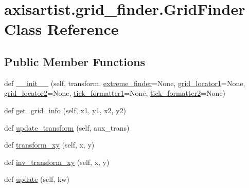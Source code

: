 \hypertarget{classaxisartist_1_1grid__finder_1_1GridFinder}{}\section{axisartist.\+grid\+\_\+finder.\+Grid\+Finder Class Reference}
\label{classaxisartist_1_1grid__finder_1_1GridFinder}
\subsection*{Public Member Functions}
\begin{DoxyCompactItemize}
\item 
def \hyperlink{classaxisartist_1_1grid__finder_1_1GridFinder_adeaa7117f68b85874c1da9c6ec4aa956}{\+\_\+\+\_\+init\+\_\+\+\_\+} (self, transform, \hyperlink{classaxisartist_1_1grid__finder_1_1GridFinder_a7dca575c2c13d46cd4fc27f5a1e5cb07}{extreme\+\_\+finder}=None, \hyperlink{classaxisartist_1_1grid__finder_1_1GridFinder_abeb0fe9750ba28d2b847e34f9da636d8}{grid\+\_\+locator1}=None, \hyperlink{classaxisartist_1_1grid__finder_1_1GridFinder_adfdea1141739ba75d0f67dc30fbc37ab}{grid\+\_\+locator2}=None, \hyperlink{classaxisartist_1_1grid__finder_1_1GridFinder_a5bfedc420fc21184b5df572bb7f5f1cc}{tick\+\_\+formatter1}=None, \hyperlink{classaxisartist_1_1grid__finder_1_1GridFinder_a23a619043edcf38696552f03e4cb5ae6}{tick\+\_\+formatter2}=None)
\item 
def \hyperlink{classaxisartist_1_1grid__finder_1_1GridFinder_a340ff860d9f9a9d0e90ffa5b76ed5bac}{get\+\_\+grid\+\_\+info} (self, x1, y1, x2, y2)
\item 
def \hyperlink{classaxisartist_1_1grid__finder_1_1GridFinder_a0597fe3ef31a55ca0effb7a7d1ed776d}{update\+\_\+transform} (self, aux\+\_\+trans)
\item 
def \hyperlink{classaxisartist_1_1grid__finder_1_1GridFinder_a6f3bf889d5608045f6130247a909270c}{transform\+\_\+xy} (self, x, y)
\item 
def \hyperlink{classaxisartist_1_1grid__finder_1_1GridFinder_aa83870fcb998bc3fd030e320eb110976}{inv\+\_\+transform\+\_\+xy} (self, x, y)
\item 
def \hyperlink{classaxisartist_1_1grid__finder_1_1GridFinder_a8634df21330fe07553747109272db2d9}{update} (self, kw)
\end{DoxyCompactItemize}
